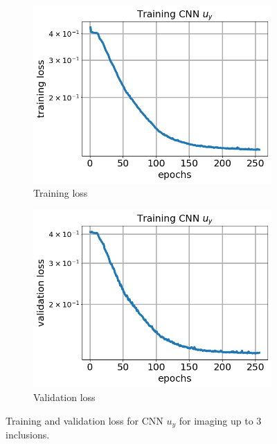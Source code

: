 \documentclass[12pt]{article}
\newcommand{\nhgfigheight}{4.0cm}
\begin{document}
\begin{figure}[h]
  \centering
  \begin{subfigure}[b]{0.45\linewidth}
    \includegraphics[totalheight=\nhgfigheight]{Figures/final3/training/uy/field_imagesy_plot_loss.png}
    \caption{Training loss}
  \end{subfigure}
  \begin{subfigure}[b]{0.45\linewidth}
    \includegraphics[totalheight=\nhgfigheight]{Figures/final3/training/uy/field_imagesy_plot_val_loss.png}
    \caption{Validation loss}
  \end{subfigure}
  \caption{\label{fig:oneinc:trainuy3} Training and validation loss for CNN $u_y$ for imaging up to 3 inclusions.}
\end{figure}
\end{document}
